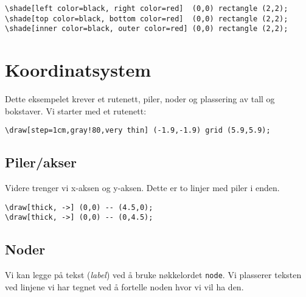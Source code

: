 \documentclass[12pt, a4paper]{article}
\begin{document}
\begin{Verbatim}[fontsize=\small]
\shade[left color=black, right color=red]  (0,0) rectangle (2,2);
\shade[top color=black, bottom color=red]  (0,0) rectangle (2,2);
\shade[inner color=black, outer color=red] (0,0) rectangle (2,2);
\end{Verbatim}

\newpage

\section{Koordinatsystem}
Dette eksempelet krever et rutenett, piler, noder og plassering av tall og bokstaver. Vi starter med et rutenett:

\begin{center}
\scalebox{0.8}{
\begin{tikzpicture}
    \draw[step=1cm,gray!80,very thin] (-1.9,-1.9) grid (5.9,5.9);
\end{tikzpicture}
}
\end{center}

\begin{Verbatim}[fontsize=\small]
\draw[step=1cm,gray!80,very thin] (-1.9,-1.9) grid (5.9,5.9);
\end{Verbatim}


\subsection{Piler/akser}
\noindent Videre trenger vi x-aksen og y-aksen. Dette er to linjer med piler i enden.

\begin{center}
\scalebox{0.8}{
\begin{tikzpicture}
    \draw[step=1cm,gray!80,very thin] (-1.9,-1.9) grid (5.9,5.9);
    \draw[thick, ->] (0,0) -- (4.5,0);
    \draw[thick, ->] (0,0) -- (0,4.5);
\end{tikzpicture}
}
\end{center}

\begin{Verbatim}[fontsize=\small]
\draw[thick, ->] (0,0) -- (4.5,0);
\draw[thick, ->] (0,0) -- (0,4.5);
\end{Verbatim}

\newpage
\subsection{Noder}
Vi kan legge på tekst (\textit{label}) ved å bruke nøkkelordet \texttt{node}. Vi plasserer teksten ved linjene vi har tegnet ved å fortelle noden hvor vi vil ha den.
\end{document}
